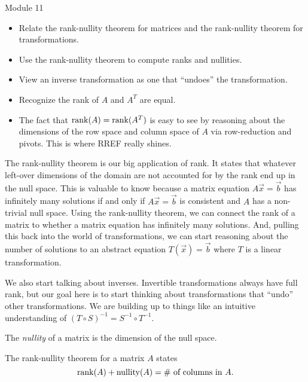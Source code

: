 \begin{lesson}

	Module 11

	\begin{itemize}
		\item Relate the rank-nullity theorem for matrices and the rank-nullity theorem for transformations.
		\item Use the rank-nullity theorem to compute ranks and nullities.
		\item View an inverse transformation as one that ``undoes'' the transformation.
		\item Recognize the rank of $A$ and $A^T$ are equal.
	\end{itemize}

	\begin{annotation}
		\begin{notes}
			\begin{itemize}
				\item The fact that $\operatorname{rank}(A)=\operatorname{rank}(A^T)$ is easy to see by reasoning
					about the dimensions of the row space and column space of $A$
					via row-reduction and pivots. This is where RREF really shines.
			\end{itemize}
		\end{notes}
	\end{annotation}
	The rank-nullity theorem is our big application of rank. It states that whatever
	left-over dimensions of the domain are not accounted for by the rank end up in the null space.
	This is valuable to know because a matrix equation $A\vec x=\vec b$ has infinitely many
	solutions if and only if $A\vec x=\vec b$ is consistent and $A$ has a non-trivial null space. Using
	the rank-nullity theorem, we can connect the rank of a matrix to whether a matrix equation has infinitely
	many solutions. And, pulling this back into the world of transformations, we can start reasoning
	about the number of solutions to an abstract equation $T(\vec x)=\vec b$ where $T$ is a linear
	transformation.

	We also start talking about inverses. Invertible transformations always have full rank, but
	our goal here is to start thinking about transformations that ``undo'' other transformations. We
	are building up to things like an intuitive understanding of $(T\circ S)^{-1} = S^{-1}\circ T^{-1}$.

\end{lesson}
	\bookonlynewpage
	\begin{theorem}
	The \emph{nullity} of a matrix is the dimension of the null space.

	The rank-nullity theorem for a matrix $A$ states
	\[
		\operatorname{rank}(A)+\operatorname{nullity}(A) = \#\text{ of columns in }A.
	\]
	\end{theorem}

